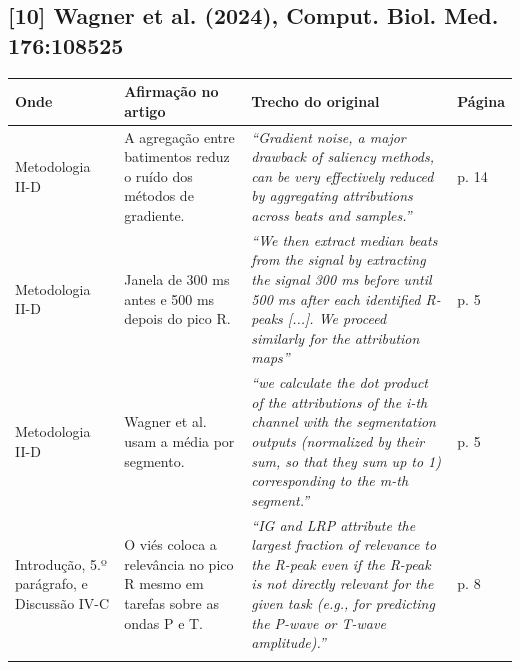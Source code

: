 \documentclass[11pt,a4paper]{article}
\begin{document}
\subsection*{[10] Wagner et al. (2024), Comput. Biol. Med. 176:108525}
\begin{longtable}{>{\raggedright\arraybackslash}p{2.6cm}>{\raggedright\arraybackslash}p{4.6cm}>{\raggedright\arraybackslash}p{7.6cm}>{\raggedright\arraybackslash}p{1.4cm}}
\toprule
\textbf{Onde} & \textbf{Afirmação no artigo} & \textbf{Trecho do original} & \textbf{Página} \\
\midrule
Metodologia II-D & A agregação entre batimentos reduz o ruído dos métodos de gradiente. & \textit{``Gradient noise, a major drawback of saliency methods, can be very effectively reduced by aggregating attributions across beats and samples.''} & p. 14 \\
\addlinespace
Metodologia II-D & Janela de 300 ms antes e 500 ms depois do pico R. & \textit{``We then extract median beats from the signal by extracting the signal 300 ms before until 500 ms after each identified R-peaks [...]. We proceed similarly for the attribution maps''} & p. 5 \\
\addlinespace
Metodologia II-D & Wagner et al. usam a média por segmento. & \textit{``we calculate the dot product of the attributions of the i-th channel with the segmentation outputs (normalized by their sum, so that they sum up to 1) corresponding to the m-th segment.''} & p. 5 \\
\addlinespace
Introdução, 5.º parágrafo, e Discussão IV-C & O viés coloca a relevância no pico R mesmo em tarefas sobre as ondas P e T. & \textit{``IG and LRP attribute the largest fraction of relevance to the R-peak even if the R-peak is not directly relevant for the given task (e.g., for predicting the P-wave or T-wave amplitude).''} & p. 8 \\
\addlinespace
\bottomrule
\end{longtable}
\end{document}

